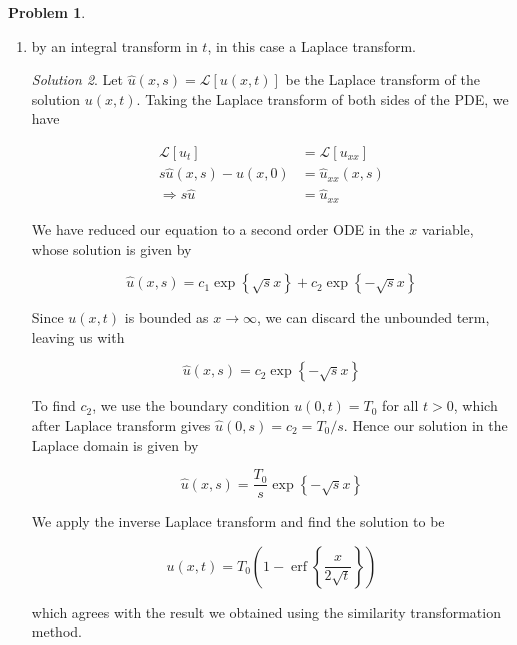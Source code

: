 \documentclass[12pt,a4paper]{article}
\theoremstyle{definition}
\newtheorem{problem}{Problem}
\theoremstyle{remark}
\newtheorem*{solution}{Solution}
\begin{document}
\begin{problem}
\begin{enumerate}
\begin{solution}
            From which it follows that $c_1 = -T_0$. Putting these together, we find our full solution to be 

            $$u(x,t) = T_0 \left(1 - \operatorname{erf}\left\{ \frac{x}{2\sqrt t} \right\} \right)$$

        \end{solution}

        \item by an integral transform in $t$, in this case a Laplace transform. 
        \begin{solution}
            Let $\hat u(x,s) = \mathcal L [u(x,t)]$ be the Laplace transform of the solution $u(x,t)$. Taking the Laplace transform of both sides of the PDE, we have 

            \begin{align*}
                \mathcal L [u_t] &= \mathcal L [u_{xx}] \\
                s \hat u(x,s) - u(x,0) &= \hat u_{xx}(x,s) \\
                \Rightarrow s \hat u &= \hat u_{xx}
            \end{align*}

            We have reduced our equation to a second order ODE in the $x$ variable, whose solution is given by 

            $$\hat u(x, s) = c_1 \exp \left\{ \sqrt s x\right\} + c_2 \exp \left\{-\sqrt s x\right\}$$

            Since $u(x,t)$ is bounded as $x \rightarrow \infty$, we can discard the unbounded term, leaving us with 

            $$\hat u(x,s) = c_2 \exp \left\{ -\sqrt s x\right\}$$

            To find $c_2$, we use the boundary condition $u(0,t) = T_0$ for all $t > 0$, which after Laplace transform gives $\hat u(0,s) =c_2= T_0/s$. Hence our solution in the Laplace domain is given by 
            
            $$\hat u (x,s) = \frac{T_0}{s} \exp \left\{ -\sqrt s x\right\}$$

            We apply the inverse Laplace transform and find the solution to be 

            $$u(x,t) = T_0\left(1- \operatorname{erf}\left\{ \frac{x}{2\sqrt t} \right\} \right)$$

            which agrees with the result we obtained using the similarity transformation method. 
        \end{solution}
    \end{enumerate}
\end{problem}
\end{document}
